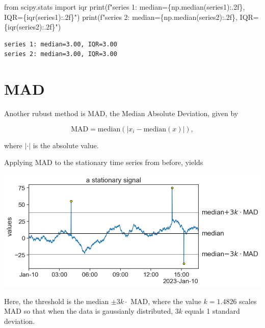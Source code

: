 \documentclass[
  letterpaper,
  DIV=11,
  numbers=noendperiod,
  oneside]{scrreprt}
\newenvironment{Shaded}{\begin{snugshade}}{\end{snugshade}}
\newcommand{\BuiltInTok}[1]{\textcolor[rgb]{0.00,0.23,0.31}{#1}}
\newcommand{\ImportTok}[1]{\textcolor[rgb]{0.00,0.46,0.62}{#1}}
\newcommand{\NormalTok}[1]{\textcolor[rgb]{0.00,0.23,0.31}{#1}}
\newcommand{\SpecialCharTok}[1]{\textcolor[rgb]{0.37,0.37,0.37}{#1}}
\newcommand{\SpecialStringTok}[1]{\textcolor[rgb]{0.13,0.47,0.30}{#1}}
\begin{document}
\begin{Shaded}
\begin{Highlighting}[]
\ImportTok{from}\NormalTok{ scipy.stats }\ImportTok{import}\NormalTok{ iqr}
\BuiltInTok{print}\NormalTok{(}\SpecialStringTok{f"series 1: median=}\SpecialCharTok{\{}\NormalTok{np}\SpecialCharTok{.}\NormalTok{median(series1)}\SpecialCharTok{:.2f\}}\SpecialStringTok{, IQR=}\SpecialCharTok{\{}\NormalTok{iqr(series1)}\SpecialCharTok{:.2f\}}\SpecialStringTok{"}\NormalTok{)}
\BuiltInTok{print}\NormalTok{(}\SpecialStringTok{f"series 2: median=}\SpecialCharTok{\{}\NormalTok{np}\SpecialCharTok{.}\NormalTok{median(series2)}\SpecialCharTok{:.2f\}}\SpecialStringTok{, IQR=}\SpecialCharTok{\{}\NormalTok{iqr(series2)}\SpecialCharTok{:.2f\}}\SpecialStringTok{"}\NormalTok{)}
\end{Highlighting}
\end{Shaded}

\begin{verbatim}
series 1: median=3.00, IQR=3.00
series 2: median=3.00, IQR=3.00
\end{verbatim}

\hypertarget{mad}{%
\section{MAD}\label{mad}}

Another rubust method is MAD, the Median Absolute Deviation, given by

\[
\text{MAD} = \text{median}(\left| x_i - \text{median}(x)  \right|),
\]

where \(|\cdot|\) is the absolute value.

Applying MAD to the stationary time series from before, yields

\includegraphics{outliers/outliers_MAD_stationary.png}

Here, the threshold is the median \(\pm3k\cdot\) MAD, where the value
\(k=1.4826\) scales MAD so that when the data is gaussianly distributed,
\(3k\) equals 1 standard deviation.
\end{document}
